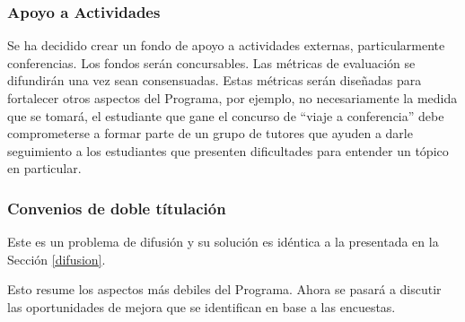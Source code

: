 \subsubsection{Apoyo a Actividades}

Se ha decidido crear un fondo de apoyo a actividades externas, particularmente conferencias. Los fondos serán concursables. Las métricas de evaluación se difundirán una vez sean consensuadas. Estas métricas serán diseñadas para fortalecer otros aspectos del Programa, por ejemplo,
no necesariamente la medida que se tomará, el estudiante que gane el concurso de ``viaje a conferencia'' debe comprometerse a formar parte 
de un grupo de tutores que ayuden a darle seguimiento a los estudiantes que presenten dificultades para entender un tópico en particular.

\subsubsection{Convenios de doble títulación}

Este es un problema de difusión y su solución es idéntica a la presentada en la Sección \ref{difusion}.


Esto resume los aspectos más debiles del Programa. Ahora se pasará a discutir las oportunidades de mejora que se identifican en base a las encuestas.



